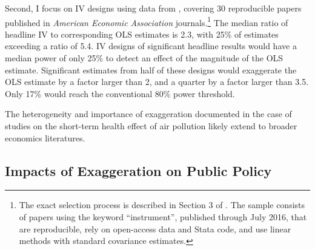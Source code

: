 \documentclass[12pt]{article}
\begin{document}
		Second, I focus on IV designs using data from \cite{young_consistency_2022}, covering 30 reproducible papers published in \textit{American Economic Association} journals.\footnote{The exact selection process is described in Section 3 of \cite{young_consistency_2022}. The sample consists of papers using the keyword ``instrument'', published through July 2016, that are reproducible, rely on open-access data and Stata code, and use linear methods with standard covariance estimates.} The median ratio of headline IV to corresponding OLS estimates is 2.3, with 25\% of estimates exceeding a ratio of 5.4. IV designs of significant headline results would have a median power of only 25\% to detect an effect of the magnitude of the OLS estimate. Significant estimates from half of these designs would exaggerate the OLS estimate by a factor larger than 2, and a quarter by a factor larger than 3.5. Only 17\% would reach the conventional 80\% power threshold. 
		
		The heterogeneity and importance of exaggeration documented in the case of studies on the short-term health effect of air pollution likely extend to broader economics literatures.

	\subsection{Impacts of Exaggeration on Public Policy}
	
\end{document}
